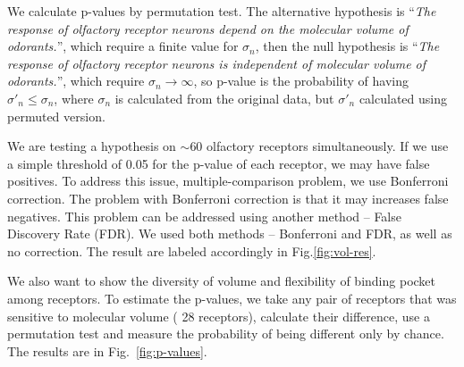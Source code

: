 \documentclass[landscape,a1paper,fontscale=0.6]{baposter} %
\newcommand{\numberofreceptors}{ 28 }
\begin{document}
\begin{poster}
{We calculate p-values by permutation test. 
The alternative hypothesis is 
``{\it The response of olfactory receptor neurons depend on the molecular volume of odorants.}'', 
which require  a finite value for $\sigma_n$, 
then the null hypothesis is 
``{\it The response of olfactory receptor neurons is independent of molecular volume of odorants.}'',
which require $\sigma_n \rightarrow \infty$, 
so p-value is the probability of having $\sigma'_n\leq\sigma_n$, 
where $\sigma_n$ is calculated from the original data, but $\sigma'_n$ calculated using permuted version.

We are testing a hypothesis on  $\sim$60 olfactory receptors simultaneously. 
If we use a simple threshold of 0.05 for the p-value of each receptor, we may have false positives. 
To address this issue, multiple-comparison problem, 
we use Bonferroni correction. 
The problem with Bonferroni correction is that it may increases false negatives.
This problem can be addressed using another method -- False Discovery Rate (FDR).
We used both methods -- Bonferroni and FDR, as well as no correction. 
The result are labeled accordingly in Fig.\ref{fig:vol-res}.

We also want to show the diversity of volume and flexibility of binding pocket among receptors.
To estimate the p-values, 
we take any pair of receptors that was sensitive to molecular volume (\numberofreceptors receptors),
calculate their difference, 
use a permutation test and measure the probability of being different only by chance.
The results are in Fig.~\ref{fig:p-values}.




}


\end{poster}
\end{document}
